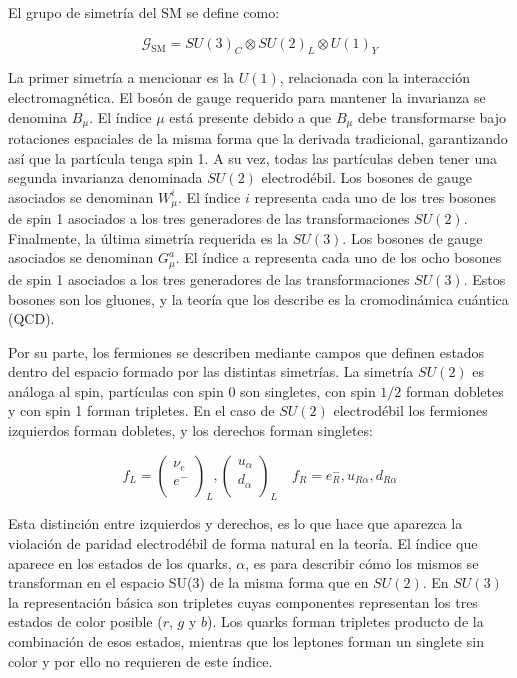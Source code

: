 El grupo de simetría del SM se define como:

\begin{equation}
	\mathcal{G}_{\text{SM}} = SU(3)_C \otimes SU(2)_L \otimes U(1)_Y
\end{equation}

La primer simetría a mencionar es la $U(1)$, relacionada con la interacción electromagnética. El bosón de gauge requerido para mantener la invarianza se denomina $B_{\mu}$. El índice $\mu$ está presente debido a que $B_{\mu}$ debe transformarse bajo rotaciones espaciales de la misma forma que la derivada tradicional, garantizando así que la partícula tenga spin 1.
A su vez, todas las partículas deben tener una segunda invarianza denominada $SU(2)$ electrodébil. Los bosones de gauge asociados se denominan $W_{\mu}^{i}$. El índice $i$ representa cada uno de los tres bosones de spin 1 asociados a los tres generadores de las transformaciones $SU(2)$.
Finalmente, la última simetría requerida es la $SU(3)$. Los bosones de gauge asociados se denominan $G_{\mu}^{a}$. El índice a representa cada uno de los ocho bosones de spin 1  asociados a los tres generadores de las transformaciones $SU(3)$. Estos bosones son los gluones, y la teoría que los describe es la cromodinámica cuántica (QCD).

Por su parte, los fermiones se describen mediante campos que definen estados dentro del espacio formado por las distintas simetrías. La simetría $SU(2)$ es análoga al spin, partículas con spin 0 son singletes, con spin $1/2$ forman dobletes y con spin 1 forman tripletes. En el caso de $SU(2)$ electrodébil los fermiones izquierdos forman dobletes, y los derechos forman singletes:

\begin{equation}
	f_L = 
	\begin{pmatrix}
	\nu_{e} \\
	e^{-} \\
	\end{pmatrix}_{L},
	\begin{pmatrix}
	u_\alpha \\
	d_\alpha \\
	\end{pmatrix}_{L}
	\quad
	f_R = e^{-}_{R},u_{R\alpha},d_{R\alpha}
\end{equation}

Esta distinción entre izquierdos y derechos, es lo que hace que aparezca la violación de paridad electrodébil de forma natural en la teoría. El índice que aparece en los estados de los quarks, $\alpha$, es para describir cómo los mismos se transforman en el espacio SU(3) de la misma forma que en $SU(2)$. En $SU(3)$ la representación básica son tripletes cuyas componentes representan los tres estados de color posible ($r$, $g$ y $b$). Los quarks forman tripletes producto de la combinación de esos estados, mientras que los leptones forman un singlete sin color y por ello no requieren de este índice.

